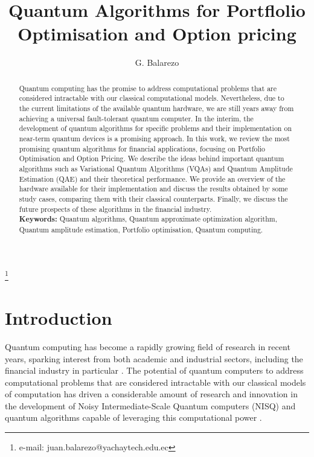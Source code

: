\documentclass[prx,twocolumn,floatfix,superscriptaddress,longbibliography]{revtex4-1}
\begin{document}
\title{Quantum Algorithms for Portflolio Optimisation and Option pricing}

\author{G. Balarezo}
\thanks{e-mail: juan.balarezo@yachaytech.edu.ec}


\begin{abstract}
Quantum computing has the promise to address computational problems that are considered intractable with our classical computational models. Nevertheless, due to the current limitations of the available quantum hardware, we are still years away from achieving a universal fault-tolerant quantum computer. In the interim, the development of quantum algorithms for specific problems and their implementation on near-term quantum devices is a promising approach. In this work, we review the most promising quantum algorithms for financial applications, focusing on Portfolio Optimisation and Option Pricing. We describe the ideas behind important quantum algorithms such as Variational Quantum Algorithms (VQAs) and Quantum Amplitude Estimation (QAE) and their theoretical performance. We provide an overview of the hardware available for their implementation and discuss the results 
obtained by some study cases, comparing them with their classical counterparts. Finally, we discuss the future prospects of these algorithms in the financial industry.
  \\
  \textbf{Keywords:} Quantum algorithms, Quantum approximate optimization algorithm, Quantum amplitude estimation, Portfolio optimisation, Quantum computing.
\end{abstract}

\maketitle

\section{Introduction}

Quantum computing has become a rapidly growing field of research in recent years, sparking interest from both academic and industrial sectors, including the financial industry in particular \cite{Hassija2020}. The potential of quantum computers to address computational problems that are considered intractable with our classical models of computation \cite{nielsen2010quantum} has driven a considerable amount of research and innovation in the development of Noisy Intermediate-Scale Quantum computers (NISQ) and quantum algorithms capable of leveraging this computational power \cite{Huang2023}. 
\end{document}
